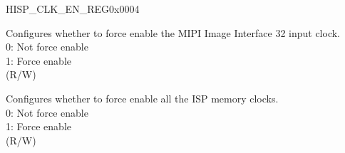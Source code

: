 \begin{register}{H}{ISP\_CLK\_EN\_REG}{0x0004}
\begin{regdesc}
\begin{reglist}
\label{fielddesc:ISPCLKMIPIIDIFORCEON}\item [ISP\_CLK\_MIPI\_IDI\_FORCE\_ON] Configures whether to force enable the MIPI Image Interface 32 input clock.\\0: Not force enable\\1: Force enable\\(R/W)
\label{fielddesc:ISPMEMCLKFORCEON}\item [ISP\_MEM\_CLK\_FORCE\_ON] Configures whether to force enable all the ISP memory clocks.\\0: Not force enable\\1: Force enable\\(R/W)
\end{reglist}\end{regdesc}
\end{register}


